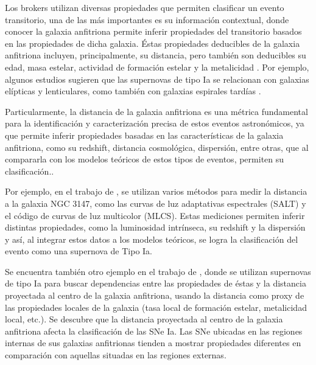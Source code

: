 \documentclass[../tesis.tex]{subfiles}
\begin{document}
Los brokers utilizan diversas propiedades que permiten clasificar un evento transitorio, una de las más importantes es su información contextual, donde conocer la galaxia anfitriona permite inferir propiedades del transitorio basados en las propiedades de dicha galaxia. Éstas propiedades deducibles de la galaxia anfitriona incluyen, principalmente, su distancia, pero también son deducibles su edad, masa estelar, actividad de formación estelar y la metalicidad \cite{delight}. Por ejemplo, algunos estudios sugieren que las supernovas de tipo Ia se relacionan con galaxias elípticas y lenticulares, como también con galaxias espirales tardías \cite{Mannucci2005}.\par\null\par

Particularmente, la distancia de la galaxia anfitriona es una métrica fundamental para la identificación y caracterización precisa de estos eventos astronómicos, ya que permite inferir propiedades basadas en las características de la galaxia anfitriona, como su redshift, distancia cosmológica, dispersión, entre otras, que al compararla con los modelos teóricos de estos tipos de eventos, permiten su clasificación.\cite{delight}.\par\null\par

Por ejemplo, en el trabajo de \cite{ngc3147}, se utilizan varios métodos para medir la distancia a la galaxia NGC 3147, como las curvas de luz adaptativas espectrales (SALT) y el código de curvas de luz multicolor (MLCS). Estas mediciones permiten inferir distintas propiedades, como la luminosidad intrínseca, su redshift y la dispersión y así, al integrar estos datos a los modelos teóricos, se logra la clasificación del evento como una supernova de Tipo Ia.\par\null\par

Se encuentra también otro ejemplo en el trabajo de \cite{ia_properties}, donde se utilizan supernovas de tipo Ia para buscar dependencias entre las propiedades de éstas y la distancia proyectada al centro de la galaxia anfitriona, usando la distancia como proxy de las propiedades locales de la galaxia (tasa local de formación estelar, metalicidad local, etc.). Se descubre que la distancia proyectada al centro de la galaxia anfitriona afecta la clasificación de las SNe Ia. Las SNe ubicadas en las regiones internas de sus galaxias anfitrionas tienden a mostrar propiedades diferentes en comparación con aquellas situadas en las regiones externas.\par\null\par
\end{document}
